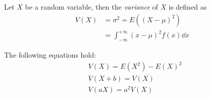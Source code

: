 \documentclass[14pt]{extarticle}
\begin{document}
\begin{definition}[variance]
    Let $X$ be a random variable, then the \emph{variance} of $X$ is defined as
    \begin{align}
        V(X) & = \sigma^2 = E((X - \mu)^2)                        \\
             & = \int_{-\infty}^{+\infty} (x - \mu)^2 f(x) \dd{x}
    \end{align}
\end{definition}

\begin{theorem}
    The following equations hold:
    \begin{align}
         & V(X) = E(X^2) - E(X)^2 \label{eq:prop_variance:1} \\
         & V(X + b) = V(X)        \label{eq:prop_variance:2} \\
         & V(aX) = a^2 V(X) \label{eq:prop_variance:3}
    \end{align}
\end{theorem}
\end{document}
